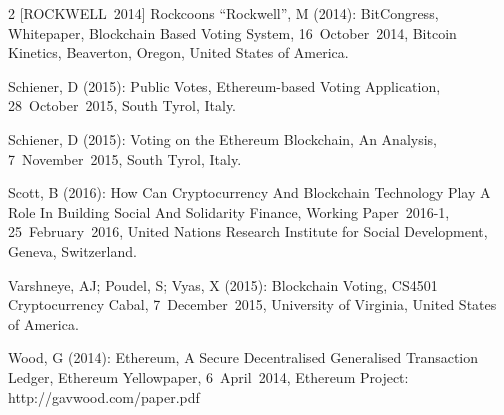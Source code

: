\documentclass[9pt,oneside]{amsart}
\begin{document}
\begin{multicols}{2}
[ROCKWELL~2014] Rockcoons \enquote{Rockwell}, M (2014): BitCongress, Whitepaper, Blockchain Based Voting System, 16~October~2014, Bitcoin Kinetics, Beaverton, Oregon, United States of America.\par
[SCHIENER~2015A] Schiener, D (2015): Public Votes, Ethereum-based Voting Application, 28~October~2015, South Tyrol, Italy.\par
[SCHIENER~2015B] Schiener, D (2015): Voting on the Ethereum Blockchain, An Analysis, 7~November~2015, South Tyrol, Italy.\par
[SCOTT~2016] Scott, B (2016): How Can Cryptocurrency And Blockchain Technology Play A Role In Building Social And Solidarity Finance, Working Paper~2016-1, 25~February~2016, United Nations Research Institute for Social Development, Geneva, Switzerland.\par
[VARSHNEYA~et~al.~2015] Varshneye, AJ; Poudel, S; Vyas, X (2015): Blockchain Voting, CS4501 Cryptocurrency Cabal, 7~December~2015, University of Virginia, United States of America.\par
[WOOD~2014] Wood, G (2014): Ethereum, A Secure Decentralised Generalised Transaction Ledger, Ethereum Yellowpaper, 6~April~2014, Ethereum Project: http://gavwood.com/paper.pdf


\end{multicols}
\end{document}
